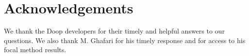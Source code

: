 \documentclass[sigconf,review,anonymous]{acmart}
\begin{document}












\section*{Acknowledgements} We thank the Doop developers for their timely and helpful answers to our questions. %
We also thank M. Ghafari for his timely response and for access to his focal method results. 



\end{document}
